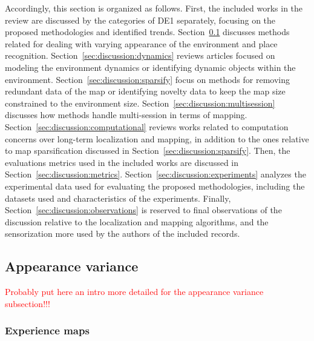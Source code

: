 Accordingly, this section is organized as follows. First, the included works in the review are discussed by the categories of DE1 separately, focusing on the proposed methodologies and identified trends. Section~\ref{sec:discussion:appearance} discusses methods related for dealing with varying appearance of the environment and place recognition. Section~\ref{sec:discussion:dynamics} reviews articles focused on modeling the environment dynamics or identifying dynamic objects within the environment. Section~\ref{sec:discussion:sparsify} focus on methods for removing redundant data of the map or identifying novelty data to keep the map size constrained to the environment size. Section~\ref{sec:discussion:multisession} discusses how methods handle multi-session in terms of mapping. Section~\ref{sec:discussion:computational} reviews works related to computation concerns over long-term localization and mapping, in addition to the ones relative to map sparsification discussed in Section~\ref{sec:discussion:sparsify}. Then, the evaluations metrics used in the included works are discussed in Section~\ref{sec:discussion:metrics}. Section~\ref{sec:discussion:experiments} analyzes the experimental data used for evaluating the proposed methodologies, including the datasets used and characteristics of the experiments. Finally, Section~\ref{sec:discussion:observations} is reserved to final observations of the discussion relative to the localization and mapping algorithms, and the sensorization more used by the authors of the included records.





\subsection{Appearance variance}
\label{sec:discussion:appearance}

\textcolor{red}{Probably put here an intro more detailed for the appearance variance subsection!!!}



\subsubsection{Experience maps}

